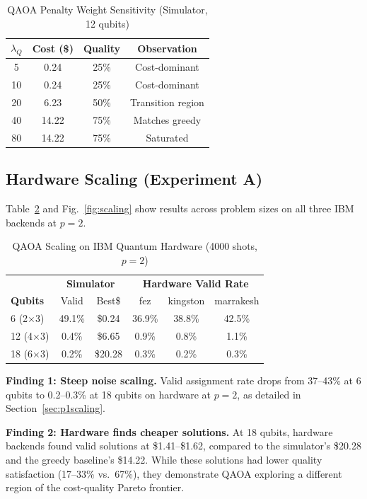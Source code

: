 \documentclass[conference]{IEEEtran}
\begin{document}
\begin{table}[h]
\centering
\caption{QAOA Penalty Weight Sensitivity (Simulator, 12 qubits)}
\label{tab:penalty}
\begin{tabular}{cccc}
\toprule
$\lambda_Q$ & Cost (\$) & Quality & Observation \\
\midrule
5 & 0.24 & 25\% & Cost-dominant \\
10 & 0.24 & 25\% & Cost-dominant \\
20 & 6.23 & 50\% & Transition region \\
40 & 14.22 & 75\% & Matches greedy \\
80 & 14.22 & 75\% & Saturated \\
\bottomrule
\end{tabular}
\end{table}

\subsection{Hardware Scaling (Experiment A)}

Table~\ref{tab:scaling} and Fig.~\ref{fig:scaling} show results across problem sizes on all three IBM backends at $p\!=\!2$.

\begin{table}[h]
\centering
\caption{QAOA Scaling on IBM Quantum Hardware (4000 shots, $p\!=\!2$)}
\label{tab:scaling}
\begin{tabular}{l|cc|ccc}
\toprule
& \multicolumn{2}{c|}{\textbf{Simulator}} & \multicolumn{3}{c}{\textbf{Hardware Valid Rate}} \\
\textbf{Qubits} & Valid & Best\$ & fez & kingston & marrakesh \\
\midrule
6 (2$\times$3) & 49.1\% & \$0.24 & 36.9\% & 38.8\% & 42.5\% \\
12 (4$\times$3) & 0.4\% & \$6.65 & 0.9\% & 0.8\% & 1.1\% \\
18 (6$\times$3) & 0.2\% & \$20.28 & 0.3\% & 0.2\% & 0.3\% \\
\bottomrule
\end{tabular}
\end{table}

\textbf{Finding 1: Steep noise scaling.} Valid assignment rate drops from 37--43\% at 6 qubits to 0.2--0.3\% at 18 qubits on hardware at $p\!=\!2$, as detailed in Section~\ref{sec:p1scaling}.

\textbf{Finding 2: Hardware finds cheaper solutions.} At 18 qubits, hardware backends found valid solutions at \$1.41--\$1.62, compared to the simulator's \$20.28 and the greedy baseline's \$14.22. While these solutions had lower quality satisfaction (17--33\% vs.\ 67\%), they demonstrate QAOA exploring a different region of the cost-quality Pareto frontier.
\end{document}
